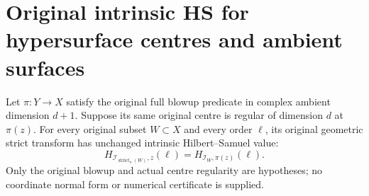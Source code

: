 \section{Original intrinsic HS for hypersurface centres and ambient surfaces}

\begin{theorem}
\label{hir:actual-hypersurface-centre-blowup-intrinsic-hs-equality}
\leanok
Let $\pi:Y\to X$ satisfy the original full blowup predicate in complex
ambient dimension $d+1$. Suppose its same original centre is regular
of dimension $d$ at $\pi(z)$. For every original subset $W\subset X$
and every order $\ell$, its original geometric strict transform has
unchanged intrinsic Hilbert--Samuel value:
\[
 H_{\mathcal I_{\operatorname{strict}_{\pi}(W)},z}(\ell)
 =H_{\mathcal I_W,\pi(z)}(\ell).
\]
Only the original blowup and actual centre regularity are hypotheses;
no coordinate normal form or numerical certificate is supplied.
\end{theorem}
